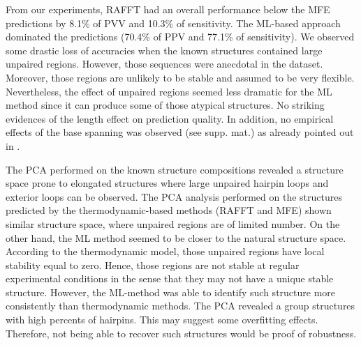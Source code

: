 \documentclass[a4paper,12pt]{article}
\begin{document}
{{From our experiments, RAFFT had an overall performance below the MFE predictions
by 8.1\% of PVV and 10.3\% of sensitivity. The ML-based approach dominated the
predictions (70.4\% of PPV and 77.1\% of sensitivity). We observed some drastic
loss of accuracies when the known structures contained large unpaired regions.
However, those sequences were anecdotal in the dataset. Moreover, those regions
are unlikely to be stable and assumed to be very flexible. Nevertheless, the
effect of unpaired regions seemed less dramatic for the ML method since it can
produce some of those atypical structures. No striking evidences of the length
effect on prediction quality. In addition, no empirical effects of the base
spanning was observed (see supp. mat.) as already pointed out in
\cite{amman13_troub_long_range_base_pairs_rna_foldin}.

The PCA performed on the known structure compositions revealed a structure space
prone to elongated structures where large unpaired hairpin loops and exterior
loops can be observed. The PCA analysis performed on the structures predicted by
the thermodynamic-based methods (RAFFT and MFE) shown similar structure space,
where unpaired regions are of limited number. On the other hand, the ML method
seemed to be closer to the natural structure space. According to the
thermodynamic model, those unpaired regions have local stability equal to zero.
Hence, those regions are not stable at regular experimental conditions in the
sense that they may not have a unique stable structure. However, the ML-method
was able to identify such structure more consistently than thermodynamic
methods. The PCA revealed a group structures with high percents of hairpins.
This may suggest some overfitting effects. Therefore, not being able to recover
such structures would be proof of robustness.

}}
\end{document}

